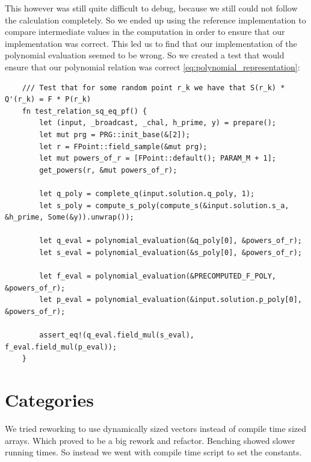 \documentclass[11pt]{report}
\theoremstyle{definition}
\theoremstyle{plain}
\begin{document}
This however was still quite difficult to debug, because we still could not follow the calculation completely.
So we ended up using the reference implementation to compare intermediate values in the computation in order to ensure that our implementation was correct. 
This led us to find that our implementation of the polynomial evaluation seemed to be wrong. So we created a test that would ensure that our polynomial relation was correct \autoref{eq:polynomial_representation}:
\begin{verbatim}
    /// Test that for some random point r_k we have that S(r_k) * Q'(r_k) = F * P(r_k)
    fn test_relation_sq_eq_pf() {
        let (input, _broadcast, _chal, h_prime, y) = prepare();
        let mut prg = PRG::init_base(&[2]);
        let r = FPoint::field_sample(&mut prg);
        let mut powers_of_r = [FPoint::default(); PARAM_M + 1];
        get_powers(r, &mut powers_of_r);

        let q_poly = complete_q(input.solution.q_poly, 1);
        let s_poly = compute_s_poly(compute_s(&input.solution.s_a, &h_prime, Some(&y)).unwrap());

        let q_eval = polynomial_evaluation(&q_poly[0], &powers_of_r);
        let s_eval = polynomial_evaluation(&s_poly[0], &powers_of_r);

        let f_eval = polynomial_evaluation(&PRECOMPUTED_F_POLY, &powers_of_r);
        let p_eval = polynomial_evaluation(&input.solution.p_poly[0], &powers_of_r);

        assert_eq!(q_eval.field_mul(s_eval), f_eval.field_mul(p_eval));
    }
\end{verbatim}


\section{Categories}\label{sub:categories} %
We tried reworking to use dynamically sized vectors instead of compile time sized arrays. Which proved to be a big rework and refactor. Benching showed slower running times. So instead we went with compile time script to set the constants.
\end{document}
